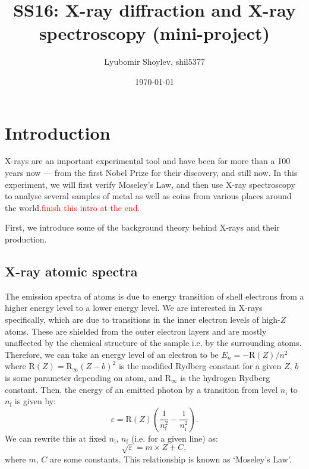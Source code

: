 \documentclass[11pt,a4paper,twoside,onecolumn]{article}
\title{\textbf{SS16: X-ray diffraction and X-ray spectroscopy (mini-project)}}
\author{Lyubomir Shoylev, shil5377}
\date{\today}
\newcommand{\reminder}[1]{\textcolor{red}{#1}}
\newcommand{\rydberg}{\mathrm{R}}
\begin{document}
\maketitle

\begin{abstract}
    \lipsum
\end{abstract}

\section{Introduction}

X-rays are an important experimental tool and have been for more than a 100 years now --- from the first Nobel Prize for their discovery, and still now. In this experiment, we will first verify Moseley's Law, and then use X-ray spectroscopy to analyse several samples of metal as well as coins from various places around the world.\reminder{finish this intro at the end.}

First, we introduce some of the background theory behind X-rays and their production.

\subsection{X-ray atomic spectra}
The emission spectra of atoms is due to energy transition of shell electrons from a higher energy level to a lower energy level. We are interested in X-rays specifically, which are due to transitions in the inner electron levels of high-$Z$ atoms. These are shielded from the outer electron layers and are mostly unaffected by the chemical structure of the sample i.e. by the surrounding atoms. Therefore, we can take an energy level of an electron to be $E_n = -\rydberg\left(Z\right) / n^2$ where $\rydberg \left(Z\right)= \rydberg_\infty \left(Z - b\right)^2$ is the modified Rydberg constant for a given $Z$, $b$ is some parameter depending on atom, and $\rydberg_\infty$ is the hydrogen Rydberg constant. Then, the energy of an emitted photon by a transition from level $n_\mathrm{i}$ to $n_\mathrm{f}$ is given by:
\begin{equation}\label{eqn:x-ray-energy}
    \varepsilon = \rydberg\left(Z\right) \left(\frac{1}{n_\mathrm{f}^2} - \frac{1}{n_\mathrm{i}^2}\right).
\end{equation}
We can rewrite this at fixed $n_\mathrm{i}$, $n_\mathrm{f}$ (i.e. for a given line) as:
\begin{equation}
    \sqrt{\varepsilon} = m \times Z + C,
\end{equation}  where $m$, $C$ are some constants. This relationship is known as `Moseley's Law'.
\end{document}
